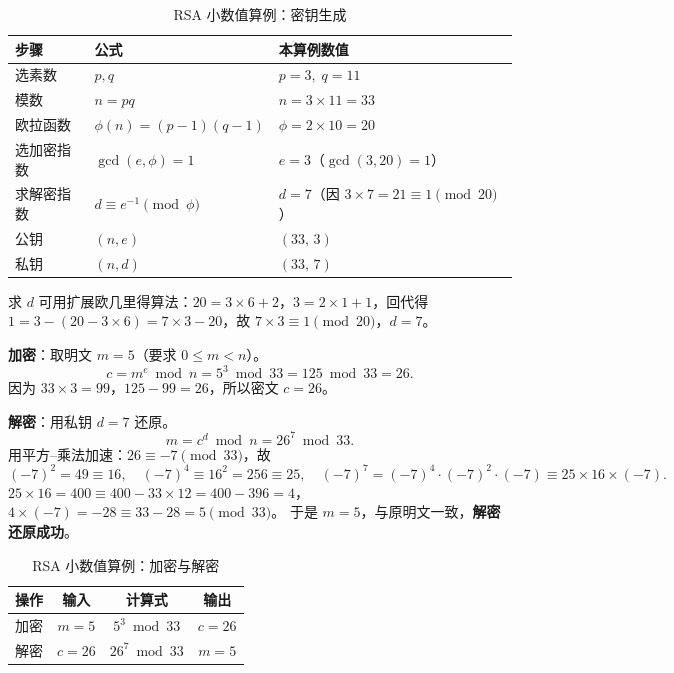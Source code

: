 \begin{table}[H]
\centering
\renewcommand{\arraystretch}{1.35}
\begin{tabulary}{\textwidth}{@{}L L L@{}}
\toprule
\textbf{步骤} & \textbf{公式} & \textbf{本算例数值} \\
\midrule
选素数 & $p,q$ & $p=3,\; q=11$ \\
模数 & $n=pq$ & $n = 3\times 11 = 33$ \\
欧拉函数 & $\phi(n)=(p-1)(q-1)$ & $\phi = 2\times 10 = 20$ \\
选加密指数 & $\gcd(e,\phi)=1$ & $e=3$（$\gcd(3,20)=1$）\\
求解密指数 & $d\equiv e^{-1}\pmod{\phi}$ & $d=7$（因 $3\times 7=21\equiv 1 \pmod{20}$）\\
公钥 & $(n,e)$ & $(33,\,3)$ \\
私钥 & $(n,d)$ & $(33,\,7)$ \\
\bottomrule
\end{tabulary}
\caption{RSA 小数值算例：密钥生成}
\label{tab:rsa-keygen}
\end{table}

求 $d$ 可用扩展欧几里得算法：$20 = 3\times6 + 2$，$3 = 2\times1 + 1$，回代得
$1 = 3 - (20 - 3\times6) = 7\times3 - 20$，故 $7\times3\equiv1\pmod{20}$，$d=7$。

\textbf{加密}：取明文 $m=5$（要求 $0\le m<n$）。
\begin{equation}
    c = m^{e} \bmod n = 5^{3} \bmod 33 = 125 \bmod 33 = 26.
\end{equation}
因为 $33\times3=99$，$125-99=26$，所以密文 $c=26$。

\textbf{解密}：用私钥 $d=7$ 还原。
\begin{equation}
    m = c^{d} \bmod n = 26^{7} \bmod 33.
\end{equation}
用平方--乘法加速：$26\equiv-7\pmod{33}$，故
\begin{equation}
    (-7)^{2}=49\equiv16,\quad (-7)^{4}\equiv16^{2}=256\equiv25,\quad
    (-7)^{7}=(-7)^{4}\cdot(-7)^{2}\cdot(-7)\equiv25\times16\times(-7).
\end{equation}
$25\times16=400\equiv 400-33\times12=400-396=4$，$4\times(-7)=-28\equiv33-28=5\pmod{33}$。
于是 $m=5$，与原明文一致，\textbf{解密还原成功}。

\begin{table}[H]
\centering
\renewcommand{\arraystretch}{1.3}
\begin{tabulary}{\textwidth}{@{}L C C C@{}}
\toprule
\textbf{操作} & \textbf{输入} & \textbf{计算式} & \textbf{输出} \\
\midrule
加密 & $m=5$ & $5^{3}\bmod 33$ & $c=26$ \\
解密 & $c=26$ & $26^{7}\bmod 33$ & $m=5$ \\
\bottomrule
\end{tabulary}
\caption{RSA 小数值算例：加密与解密}
\label{tab:rsa-enc}
\end{table}

